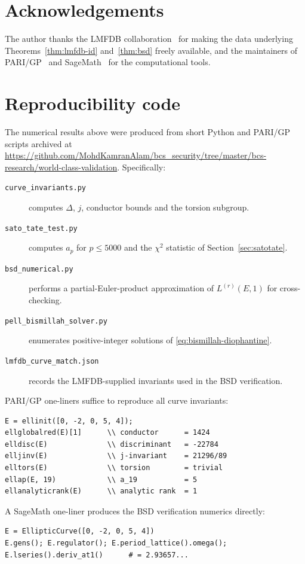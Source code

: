 \documentclass[11pt,a4paper]{article}
\theoremstyle{plain}
\theoremstyle{definition}
\begin{document}
\section*{Acknowledgements}

The author thanks the LMFDB collaboration~\cite{LMFDB} for making the
data underlying Theorems~\ref{thm:lmfdb-id} and~\ref{thm:bsd} freely
available, and the maintainers of PARI/GP~\cite{PARI} and
SageMath~\cite{Sage} for the computational tools.

\appendix

\section{Reproducibility code}\label{app:repro}

The numerical results above were produced from short Python and PARI/GP
scripts archived at
\url{https://github.com/MohdKamranAlam/bcs_security/tree/master/bcs-research/world-class-validation}.
Specifically:
\begin{description}
\item[\texttt{curve\_invariants.py}] computes $\Delta$, $j$, conductor
  bounds and the torsion subgroup.
\item[\texttt{sato\_tate\_test.py}] computes $a_p$ for $p \le 5000$
  and the $\chi^2$ statistic of Section~\ref{sec:satotate}.
\item[\texttt{bsd\_numerical.py}] performs a partial-Euler-product
  approximation of $L^{(r)}(E,1)$ for cross-checking.
\item[\texttt{pell\_bismillah\_solver.py}] enumerates positive-integer
  solutions of \eqref{eq:bismillah-diophantine}.
\item[\texttt{lmfdb\_curve\_match.json}] records the LMFDB-supplied
  invariants used in the BSD verification.
\end{description}
PARI/GP one-liners suffice to reproduce all curve invariants:
\begin{verbatim}
E = ellinit([0, -2, 0, 5, 4]);
ellglobalred(E)[1]      \\ conductor      = 1424
elldisc(E)              \\ discriminant   = -22784
elljinv(E)              \\ j-invariant    = 21296/89
elltors(E)              \\ torsion        = trivial
ellap(E, 19)            \\ a_19           = 5
ellanalyticrank(E)      \\ analytic rank  = 1
\end{verbatim}

A SageMath one-liner produces the BSD verification numerics directly:
\begin{verbatim}
E = EllipticCurve([0, -2, 0, 5, 4])
E.gens(); E.regulator(); E.period_lattice().omega();
E.lseries().deriv_at1()      # = 2.93657...
\end{verbatim}



\end{document}
